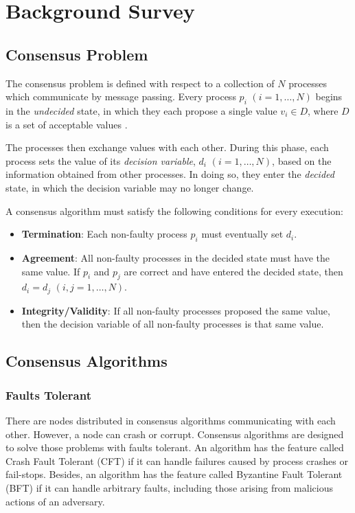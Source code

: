 \documentclass[12pt, a4paper]{article}
\begin{document}
\section{Background Survey} 
\subsection{Consensus Problem } \label{sec:consensus-def}

The consensus problem is defined with respect to a collection of $N$ processes
which communicate by message passing. Every process $p_{i}$ $(i = 1, \ldots, N)$
begins in the \textit{undecided} state, in which they each propose a single
value $v_{i} \in D$, where $D$ is a set of acceptable values
\cite{coulouris2005distributed}.

The processes then exchange values with each other. During this phase, each
process sets the value of its \textit{decision variable}, $d_i$ $(i = 1, \ldots,
N)$, based on the information obtained from other processes. In doing so, they
enter the \textit{decided} state, in which the decision variable may no longer
change.

A consensus algorithm must satisfy the following conditions for every execution:

\begin{itemize}
  \item \textbf{Termination}: Each non-faulty process $p_i$ must eventually set
    $d_i$.
  \item \textbf{Agreement}: All non-faulty processes in the decided state
    must have the same value. If $p_{i}$ and $p_{j}$ are correct and have
    entered the decided state, then $d_{i} = d_{j}$ $(i, j = 1, \ldots, N)$.
  \item \textbf{Integrity/Validity}: If all non-faulty processes proposed
    the same value, then the decision variable of all non-faulty processes is
    that same value.
\end{itemize}

\subsection{Consensus Algorithms}
\subsubsection{Faults Tolerant}
There are nodes distributed in consensus algorithms communicating with each other.
However, a node can crash or corrupt. Consensus algorithms are designed 
to solve those problems with faults tolerant.
An algorithm has the feature called Crash Fault Tolerant (CFT)
if it can handle failures caused by process crashes or fail-stops.
Besides, an algorithm has the feature called Byzantine Fault Tolerant (BFT) 
if it can handle arbitrary faults, 
including those arising from malicious actions of an adversary.
\end{document}
